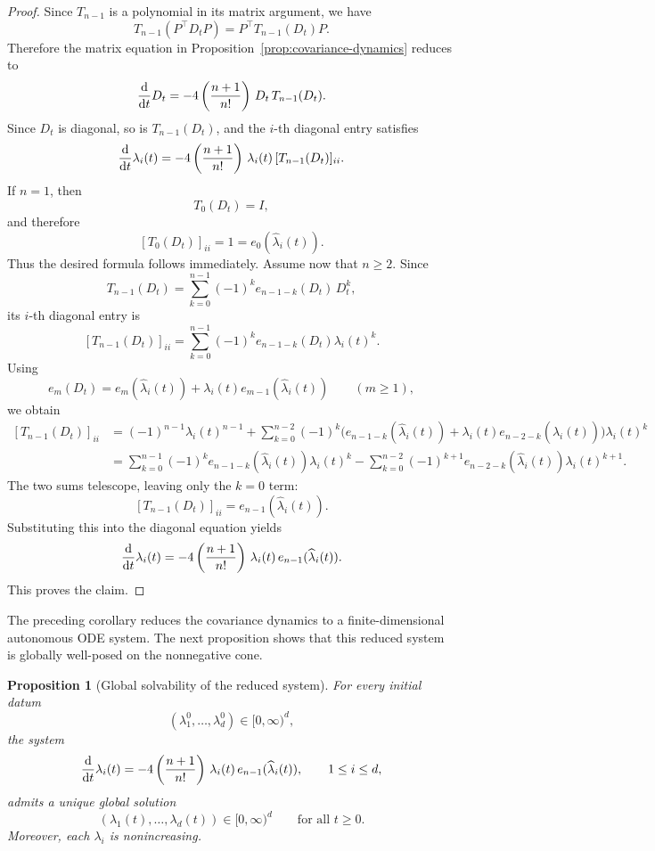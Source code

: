 \documentclass[11pt,reqno]{amsart}
\numberwithin{figure}{section}
\def\d {{\partial}}
\def\d{\mathrm{d}}
\renewcommand{\d}{  {\textup{d}} }
\newtheorem{proposition}{Proposition}[section]
\begin{document}
\begin{proof} 
Since $T_{n-1}$ is a polynomial in its matrix argument, we have \[ T_{n-1}(P^\top D_tP)=P^\top T_{n-1}(D_t)P. \] Therefore the matrix equation in Proposition~\ref{prop:covariance-dynamics} reduces to \[ \frac{\d}{\d t}D_t = -4\left(\frac{n+1}{n!}\right)\,D_t\,T_{n-1}(D_t). \] Since $D_t$ is diagonal, so is $T_{n-1}(D_t)$, and the $i$-th diagonal entry satisfies \[ \frac{\d}{\d t}\lambda_i(t) = -4\left(\frac{n+1}{n!}\right)\,\lambda_i(t)\,[T_{n-1}(D_t)]_{ii}. \] If $n=1$, then \[ T_0(D_t)=I, \] and therefore \[ [T_0(D_t)]_{ii}=1=e_0(\widehat\lambda_i(t)). \] Thus the desired formula follows immediately. Assume now that $n\ge2$. Since \[ T_{n-1}(D_t) = \sum_{k=0}^{n-1}(-1)^k e_{n-1-k}(D_t)\,D_t^k, \] its $i$-th diagonal entry is \[ [T_{n-1}(D_t)]_{ii} = \sum_{k=0}^{n-1}(-1)^k e_{n-1-k}(D_t)\lambda_i(t)^k. \] Using \[ e_m(D_t)=e_m(\widehat\lambda_i(t))+\lambda_i(t)e_{m-1}(\widehat\lambda_i(t)) \qquad (m\ge1), \] we obtain \[ \begin{aligned} [T_{n-1}(D_t)]_{ii} &= (-1)^{n-1}\lambda_i(t)^{n-1} +\sum_{k=0}^{n-2}(-1)^k \Big( e_{n-1-k}(\widehat\lambda_i(t)) +\lambda_i(t)e_{n-2-k}(\widehat\lambda_i(t)) \Big)\lambda_i(t)^k \\ &= \sum_{k=0}^{n-1}(-1)^k e_{n-1-k}(\widehat\lambda_i(t))\lambda_i(t)^k - \sum_{k=0}^{n-2}(-1)^{k+1} e_{n-2-k}(\widehat\lambda_i(t))\lambda_i(t)^{k+1}. \end{aligned} \] The two sums telescope, leaving only the $k=0$ term: \[ [T_{n-1}(D_t)]_{ii}=e_{n-1}(\widehat\lambda_i(t)). \] Substituting this into the diagonal equation yields \[ \frac{\d}{\d t}\lambda_i(t) = -4\left(\frac{n+1}{n!}\right)\,\lambda_i(t)\,e_{n-1}(\widehat\lambda_i(t)). \] This proves the claim. \end{proof}

The preceding corollary reduces the covariance dynamics to a finite-dimensional autonomous ODE system. The next proposition shows that this reduced system is globally well-posed on the nonnegative cone. 


\begin{proposition}[Global solvability of the reduced system] \label{prop:global-reduced-system} For every initial datum \[ (\lambda_1^0,\dots,\lambda_d^0)\in [0,\infty)^d, \] the system \begin{equation}\label{2.2}
\frac{\d}{\d t}\lambda_i(t) = -4\left(\frac{n+1}{n!}\right)\,\lambda_i(t)\,e_{n-1}(\widehat\lambda_i(t)), \qquad 1\le i\le d,
\end{equation} admits a unique global solution \[ (\lambda_1(t),\dots,\lambda_d(t))\in [0,\infty)^d \qquad\text{for all }t\ge0. \] Moreover, each $\lambda_i$ is nonincreasing. \end{proposition} 
\end{document}
